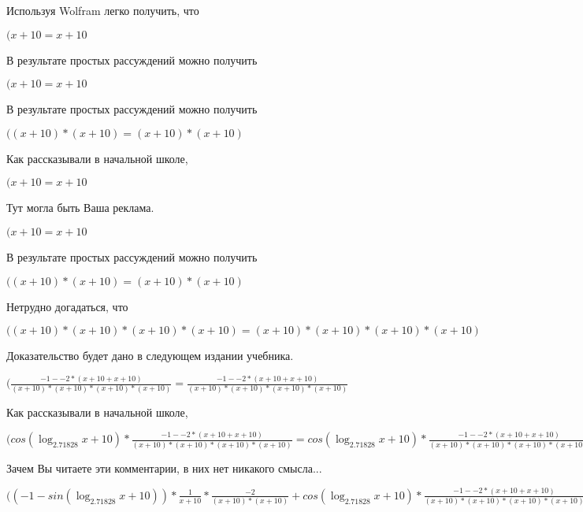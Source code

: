 \documentclass[12pt,a4paper,fleqn]{article}
\theoremstyle{definition}
\begin{document}
Используя Wolfram легко получить, что

$( x  +  10  =  x  +  10 $

В результате простых рассуждений можно получить

$( x  +  10  =  x  +  10 $

В результате простых рассуждений можно получить

$(( x  +  10 ) * ( x  +  10 ) = ( x  +  10 ) * ( x  +  10 )$

Как рассказывали в начальной школе,

$( x  +  10  =  x  +  10 $

Тут могла быть Ваша реклама.

$( x  +  10  =  x  +  10 $

В результате простых рассуждений можно получить

$(( x  +  10 ) * ( x  +  10 ) = ( x  +  10 ) * ( x  +  10 )$

Нетрудно догадаться, что

$(( x  +  10 ) * ( x  +  10 ) * ( x  +  10 ) * ( x  +  10 ) = ( x  +  10 ) * ( x  +  10 ) * ( x  +  10 ) * ( x  +  10 )$

Доказательство будет дано в следующем издании учебника.

$(\frac{ -1  -  -2  * ( x  +  10  +  x  +  10 )}{( x  +  10 ) * ( x  +  10 ) * ( x  +  10 ) * ( x  +  10 )}
 = \frac{ -1  -  -2  * ( x  +  10  +  x  +  10 )}{( x  +  10 ) * ( x  +  10 ) * ( x  +  10 ) * ( x  +  10 )}
$

Как рассказывали в начальной школе,

$(cos(\log_{ 2.71828 }{ x  +  10 }) * \frac{ -1  -  -2  * ( x  +  10  +  x  +  10 )}{( x  +  10 ) * ( x  +  10 ) * ( x  +  10 ) * ( x  +  10 )}
 = cos(\log_{ 2.71828 }{ x  +  10 }) * \frac{ -1  -  -2  * ( x  +  10  +  x  +  10 )}{( x  +  10 ) * ( x  +  10 ) * ( x  +  10 ) * ( x  +  10 )}
$

Зачем Вы читаете эти комментарии, в них нет никакого смысла...

$(( -1  - sin(\log_{ 2.71828 }{ x  +  10 })) * \frac{ 1 }{ x  +  10 }
 * \frac{ -2 }{( x  +  10 ) * ( x  +  10 )}
 + cos(\log_{ 2.71828 }{ x  +  10 }) * \frac{ -1  -  -2  * ( x  +  10  +  x  +  10 )}{( x  +  10 ) * ( x  +  10 ) * ( x  +  10 ) * ( x  +  10 )}
 = ( -1  - sin(\log_{ 2.71828 }{ x  +  10 })) * \frac{ 1 }{ x  +  10 }
 * \frac{ -2 }{( x  +  10 ) * ( x  +  10 )}
 + cos(\log_{ 2.71828 }{ x  +  10 }) * \frac{ -1  -  -2  * ( x  +  10  +  x  +  10 )}{( x  +  10 ) * ( x  +  10 ) * ( x  +  10 ) * ( x  +  10 )}
$
\end{document}
